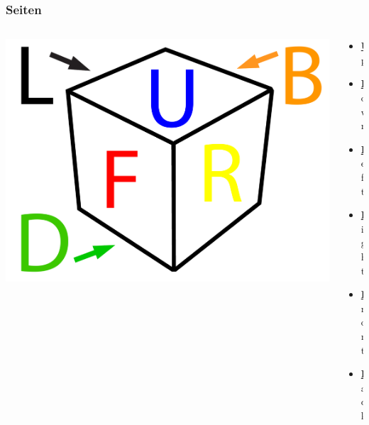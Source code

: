 \begin{frame}
	\frametitle{Seiten}

	\begin{columns}[c]
		\begin{column}[C]{.8\textwidth}
			\center
			\includegraphics[scale=0.3]{img/sides}
		\end{column}
		\begin{column}[C]{.2\textwidth}
			\begin{itemize}
				\item \textbf{\underline{U}}p
				\item \textbf{\underline{D}}own
				\item \textbf{\underline{L}}eft
				\item \textbf{\underline{R}}ight
				\item \textbf{\underline{F}}ront
				\item \textbf{\underline{B}}ack
			\end{itemize}
		\end{column}
	\end{columns}
	
\end{frame}

